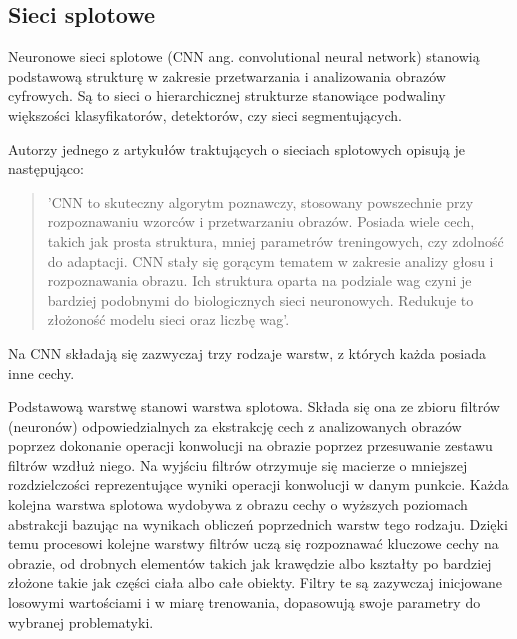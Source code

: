 
  \subsection{Sieci splotowe}
    \label{sieci_splotowe}

    Neuronowe sieci splotowe (CNN ang. convolutional neural network) stanowią podstawową strukturę w zakresie przetwarzania i analizowania obrazów cyfrowych. Są to sieci o hierarchicznej strukturze stanowiące podwaliny większości klasyfikatorów, detektorów, czy sieci segmentujących.

    Autorzy jednego z artykułów traktujących o sieciach splotowych \cite{cnn} opisują je następująco:
    \begin{quote}
      'CNN to skuteczny algorytm poznawczy, stosowany powszechnie przy rozpoznawaniu wzorców i przetwarzaniu obrazów. Posiada wiele cech, takich jak prosta struktura, mniej parametrów treningowych, czy zdolność do adaptacji. CNN stały się gorącym tematem w zakresie analizy głosu i rozpoznawania obrazu. Ich struktura oparta na podziale wag czyni je bardziej podobnymi do biologicznych sieci neuronowych. Redukuje to złożoność modelu sieci oraz liczbę wag'.
    \end{quote}

    Na CNN składają się zazwyczaj trzy rodzaje warstw, z których każda posiada inne cechy.

    Podstawową warstwę stanowi warstwa splotowa. Składa się ona ze zbioru filtrów (neuronów) odpowiedzialnych za ekstrakcję cech z analizowanych obrazów poprzez dokonanie operacji
    konwolucji na obrazie poprzez przesuwanie zestawu filtrów wzdłuż niego.
    Na wyjściu filtrów otrzymuje się macierze o mniejszej rozdzielczości
    reprezentujące wyniki operacji konwolucji w danym punkcie. Każda kolejna warstwa splotowa wydobywa z obrazu cechy o wyższych poziomach abstrakcji
    bazując na wynikach obliczeń poprzednich warstw tego rodzaju. Dzięki temu
    procesowi kolejne warstwy filtrów uczą się
    rozpoznawać kluczowe cechy na obrazie, od drobnych elementów takich jak
    krawędzie albo kształty po bardziej złożone takie jak części ciała albo
    całe obiekty. Filtry te są zazywczaj inicjowane losowymi wartościami i w miarę trenowania, dopasowują swoje parametry do wybranej problematyki.

